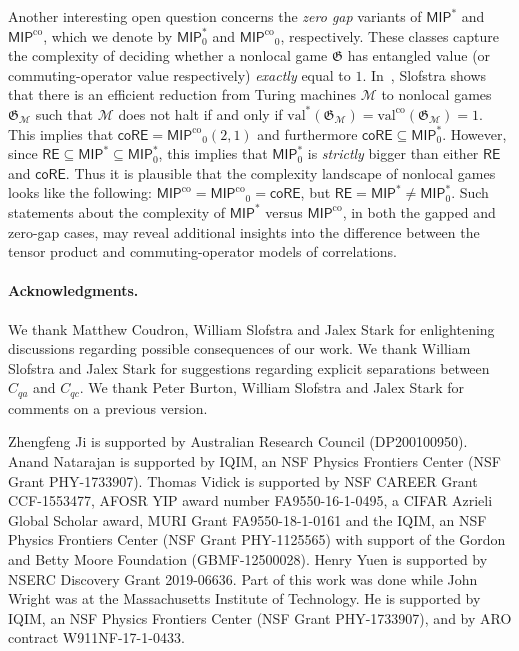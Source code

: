 \documentclass[11pt]{article}
\theoremstyle{definition}
\newcommand{\val}{\ensuremath{\mathrm{val}}}
\newcommand{\valco}{\ensuremath{\mathrm{val}^{\mathrm{co}}}}
\newcommand{\game}{\mathfrak{G}}
\newcommand{\class}[1]{\ensuremath{\mathsf{#1}}\xspace}
\newcommand{\MIP}{\class{MIP}} %
\newcommand{\MIPco}{\class{MIP^{\mathrm{co}}}} %
\newcommand{\RE}{\class{RE}} %
\newcommand{\coRE}{\class{coRE}}
\newcommand{\machine}{\cal{M}}
\renewcommand{\cal}[1]{\mathcal{#1}}
\begin{document}
Another interesting open question concerns the \emph{zero gap} variants of $\MIP^*$ and $\MIPco$, which we denote by $\MIP^*_0$ and $\MIPco_0$, respectively. These classes capture the complexity of deciding whether a nonlocal game $\game$ has entangled value (or commuting-operator value respectively) \emph{exactly} equal to $1$. In~\cite{slofstra2019set}, Slofstra shows that there is an efficient reduction from Turing machines $\cal{M}$ to nonlocal games $\game_\machine$ such that $\machine$ does not halt if and only if $\val^*(\game_\machine) = \valco(\game_\machine) = 1$. This implies that $\coRE = \MIPco_0(2,1)$ and furthermore $\coRE \subseteq \MIP^*_0$. However, since $\RE \subseteq \MIP^* \subseteq \MIP^*_0$, this implies that $\MIP^*_0$ is \emph{strictly} bigger than either $\RE$ and $\coRE$. Thus it is plausible that the complexity landscape of nonlocal games looks like the following: $\MIPco = \MIPco_0 = \coRE$, but $\RE = \MIP^* \neq \MIP^*_0$. Such statements about the complexity of $\MIP^*$ versus $\MIPco$, in both the gapped and zero-gap cases, may reveal additional insights into the difference between the tensor product and commuting-operator models of correlations.



\paragraph{Acknowledgments.} We thank Matthew Coudron, William Slofstra and Jalex Stark for enlightening discussions regarding possible consequences of our work. We thank William Slofstra and Jalex Stark for suggestions regarding explicit separations between $C_{qa}$ and $C_{qc}$. We thank Peter Burton, William Slofstra and Jalex Stark for comments on a previous version. 

Zhengfeng Ji is supported by Australian Research Council (DP200100950). Anand Natarajan is supported by IQIM, an NSF Physics Frontiers Center (NSF Grant PHY-1733907). Thomas Vidick is supported by NSF CAREER Grant CCF-1553477, AFOSR YIP award number FA9550-16-1-0495, a CIFAR Azrieli Global Scholar award, MURI Grant FA9550-18-1-0161 and the IQIM, an NSF Physics Frontiers Center (NSF Grant PHY-1125565) with support of the Gordon and Betty Moore Foundation (GBMF-12500028). Henry Yuen is supported by NSERC Discovery Grant 2019-06636.
Part of this work was done while John Wright was at the Massachusetts Institute of Technology.
He is supported by IQIM, an NSF Physics Frontiers Center (NSF Grant PHY-1733907), and by ARO contract W911NF-17-1-0433.
\end{document}
